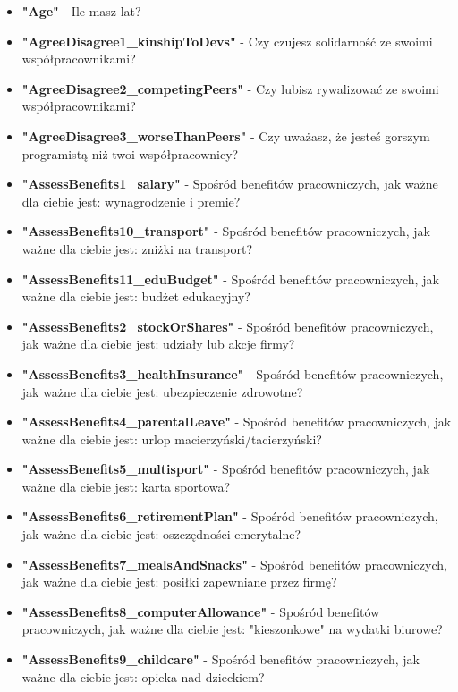 \begin{appendices}
    \begin{itemize}
        \item \textbf{"Age"} - Ile masz lat?
        \item \textbf{"AgreeDisagree1\_kinshipToDevs"} - Czy czujesz solidarność ze swoimi współpracownikami?
        \item \textbf{"AgreeDisagree2\_competingPeers"} - Czy lubisz rywalizować ze swoimi współpracownikami?
        \item \textbf{"AgreeDisagree3\_worseThanPeers"} - Czy uważasz, że jesteś gorszym programistą niż twoi współpracownicy?
        \item \textbf{"AssessBenefits1\_salary"} - Spośród benefitów pracowniczych, jak ważne dla ciebie jest: wynagrodzenie i premie?
        \item \textbf{"AssessBenefits10\_transport"} - Spośród benefitów pracowniczych, jak ważne dla ciebie jest: zniżki na transport?
        \item \textbf{"AssessBenefits11\_eduBudget"} - Spośród benefitów pracowniczych, jak ważne dla ciebie jest: budżet edukacyjny?
        \item \textbf{"AssessBenefits2\_stockOrShares"} - Spośród benefitów pracowniczych, jak ważne dla ciebie jest: udziały lub akcje firmy?
        \item \textbf{"AssessBenefits3\_healthInsurance"} - Spośród benefitów pracowniczych, jak ważne dla ciebie jest: ubezpieczenie zdrowotne?
        \item \textbf{"AssessBenefits4\_parentalLeave"} - Spośród benefitów pracowniczych, jak ważne dla ciebie jest: urlop macierzyński/tacierzyński?
        \item \textbf{"AssessBenefits5\_multisport"} - Spośród benefitów pracowniczych, jak ważne dla ciebie jest: karta sportowa?
        \item \textbf{"AssessBenefits6\_retirementPlan"} - Spośród benefitów pracowniczych, jak ważne dla ciebie jest: oszczędności emerytalne?
        \item \textbf{"AssessBenefits7\_mealsAndSnacks"} - Spośród benefitów pracowniczych, jak ważne dla ciebie jest: posiłki zapewniane przez firmę?
        \item \textbf{"AssessBenefits8\_computerAllowance"} - Spośród benefitów pracowniczych, jak ważne dla ciebie jest: "kieszonkowe" na wydatki biurowe?
        \item \textbf{"AssessBenefits9\_childcare"} - Spośród benefitów pracowniczych, jak ważne dla ciebie jest: opieka nad dzieckiem?

\end{itemize}
\end{appendices}
